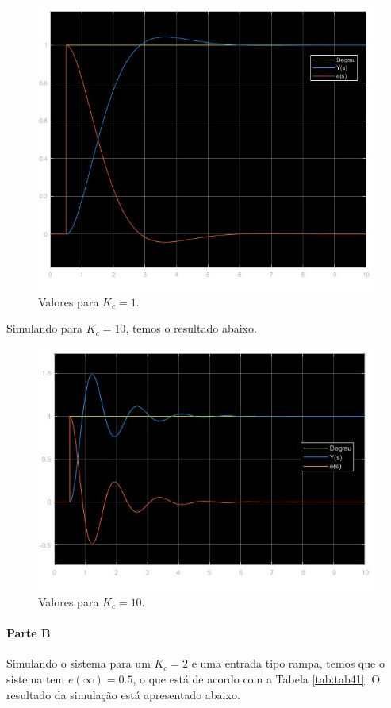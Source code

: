 \documentclass[
]{book}
\begin{document}
\begin{figure}
\includegraphics[width=0.8\linewidth]{Imagens/Lab4/Resolução/prob2A1} \caption{Valores para $K_c = 1$.}\label{fig:fig42A1}
\end{figure}

Simulando para \(K_c = 10\), temos o resultado abaixo.

\begin{figure}
\includegraphics[width=0.8\linewidth]{Imagens/Lab4/Resolução/prob2A2} \caption{Valores para $K_c = 10$.}\label{fig:fig42A2}
\end{figure}

\hypertarget{parte-b-1}{%
\paragraph*{Parte B}\label{parte-b-1}}

Simulando o sistema para um \(K_c = 2\) e uma entrada tipo rampa, temos que o sistema tem \(e(\infty) = 0.5\), o que está de acordo com a Tabela \ref{tab:tab41}. O resultado da simulação está apresentado abaixo.
\end{document}

